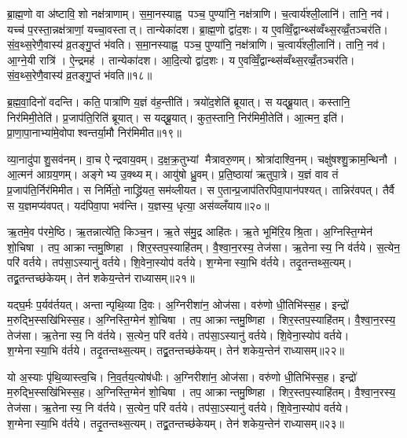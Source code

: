 ब्रा॒ह्म॒णो वा अ॑ष्टावि॒शो नक्ष॑त्राणाम्। स॒मा॒नस्याह्न॒ पञ्च॒ पुण्या॑नि॒ नक्ष॑त्राणि। च॒त्वार्य॑श्ली॒लानि॑। तानि॒ नव॑। यच्च॑ प॒रस्ता॒न्नक्ष॑त्राणां॒ यच्चा॒वस्तात्। तान्येका॑दश। ब्रा॒ह्म॒णो द्वा॑द॒शः। य ए॒वव्विँ॒द्वान्थ्स॑व्वँथ्स॒रव्व्रँ॒तञ्चर॑ति। सं॒व॒थ्स॒रेणै॒वास्य॑ व्र॒तङ्गु॒प्तं भ॑वति। स॒मा॒नस्याह्न॒ पञ्च॒ पुण्या॑नि॒ नक्ष॑त्राणि। च॒त्वार्य॑श्ली॒लानि॑। तानि॒ नव॑। आ॒ग्ने॒यी रात्रि॑। ऐ॒न्द्रमह॑। तान्येका॑दश। आ॒दि॒त्यो द्वा॑द॒शः। य ए॒वव्विँ॒द्वान्थ्स॑व्वँथ्स॒रव्व्रँ॒तञ्चर॑ति। सं॒व॒थ्स॒रेणै॒वास्य॑ व्र॒तङ्गु॒प्तं भ॑वति॥१८॥\anuvakamend[स॒ङ्ग॒वाथ्षो॑ड॒शिन॒न्निर॑मिमत॒ तत्तदात्त॑वीर्यन्निर्मा॒र्गो व॑देद्भवति समा॒नस्याह्न॒ पञ्च॒ पुण्या॑नि॒ नक्ष॑त्राण्य॒ष्टौ च॑]

ब्र॒ह्म॒वा॒दिनो॑ वदन्ति। कति॒ पात्रा॑णि य॒ज्ञं व॑ह॒न्तीति॑। त्रयो॑द॒शेति॑ ब्रूयात्। स यद्ब्रू॒यात्। कस्तानि॒ निर॑मिमी॒तेति॑। प्र॒जाप॑ति॒रिति॑ ब्रूयात्। स यद्ब्रू॒यात्। कुत॒स्तानि॒ निर॑मिमी॒तेति॑। आ॒त्मन॒ इति॑। प्रा॒णा॒पा॒नाभ्या॑मे॒वोपाश्वन्तर्या॒मौ निर॑मिमीत॥१९॥

व्या॒नादु॑पाशु॒सव॑नम्। वा॒च ऐन्द्रवाय॒वम्। द॒क्ष॒क्र॒तुभ्यां मैत्रावरु॒णम्। श्रोत्रा॑दाश्वि॒नम्। चक्षु॑षश्शु॒क्राम॒न्थिनौ। आ॒त्मन॑ आग्रय॒णम्। अङ्गेभ्य उ॒क्थ्यम्। आयु॑षो ध्रु॒वम्। प्र॒ति॒ष्ठाया॑ ऋतुपा॒त्रे। य॒ज्ञं वाव तं प्र॒जाप॑ति॒र्निर॑मिमीत। स निर्मि॑तो॒ नाद्ध्रि॑यत॒ सम॑व्लीयत। स ए॒तान्प्र॒जाप॑तिरपिवा॒पान॑पश्यत्। तान्निर॑वपत्। तैर्वै स य॒ज्ञमप्य॑वपत्। यद॑पिवा॒पा भव॑न्ति। य॒ज्ञस्य॒ धृत्या॒ अस॑व्व्लँयाय॥२०॥\anuvakamend[उ॒पा॒श्व॒न्त॒र्या॒मौ निर॑मिमीतामिमीत॒ षट्च॑]

ऋ॒तमे॒व प॑रमे॒ष्ठि। ऋ॒तन्नात्ये॑ति॒ किञ्च॒न। ऋ॒ते स॑मु॒द्र आहि॑तः। ऋ॒ते भूमि॑रि॒यश्रि॒ता। अ॒ग्निस्ति॒ग्मेन॑ शो॒चिषा। तप॒ आक्रान्तमु॒ष्णिहा। शिर॒स्तप॒स्याहि॑तम्। वै॒श्वा॒न॒रस्य॒ तेज॑सा। ऋ॒तेनास्य॒ नि व॑र्तये। स॒त्येन॒ परि॑ वर्तये। तप॑सा॒ऽस्यानु॑ वर्तये। शि॒वेना॒स्योप॑ वर्तये। श॒ग्मेनास्या॒भि व॑र्तये। तदृ॒तन्तथ्स॒त्यम्। तद्व्र॒तन्तच्छ॑केयम्। तेन॑ शकेय॒न्तेन॑ राध्यासम्॥२१॥

यद्घ॒र्मः प॒र्यव॑र्तयत्। अन्तान्पृथि॒व्या दि॒वः। अ॒ग्निरीशा॑न॒ ओज॑सा। वरु॑णो धी॒तिभि॑स्स॒ह। इन्द्रो॑ म॒रुद्भि॒स्सखि॑भिस्स॒ह। अ॒ग्निस्ति॒ग्मेन॑ शो॒चिषा। तप॒ आक्रान्तमु॒ष्णिहा। शिर॒स्तप॒स्याहि॑तम्। वै॒श्वा॒न॒रस्य॒ तेज॑सा। ऋ॒तेनास्य॒ नि व॑र्तये। स॒त्येन॒ परि॑ वर्तये। तप॑सा॒ऽस्यानु॑ वर्तये। शि॒वेना॒स्योप॑ वर्तये। श॒ग्मेनास्या॒भि व॑र्तये। तदृ॒तन्तथ्स॒त्यम्। तद्व्र॒तन्तच्छ॑केयम्। तेन॑ शकेय॒न्तेन॑ राध्यासम्॥२२॥

यो अ॒स्याः पृ॑थि॒व्यास्त्व॒चि। नि॒व॒र्तय॒त्योष॑धीः। अ॒ग्निरीशा॑न॒ ओज॑सा। वरु॑णो धी॒तिभि॑स्स॒ह। इन्द्रो॑ म॒रुद्भि॒स्सखि॑भिस्स॒ह। अ॒ग्निस्ति॒ग्मेन॑ शो॒चिषा। तप॒ आक्रान्तमु॒ष्णिहा। शिर॒स्तप॒स्याहि॑तम्। वै॒श्वा॒न॒रस्य॒ तेज॑सा। ऋ॒तेनास्य॒ नि व॑र्तये। स॒त्येन॒ परि॑ वर्तये। तप॑सा॒ऽस्यानु॑ वर्तये। शि॒वेना॒स्योप॑ वर्तये। श॒ग्मेनास्या॒भि व॑र्तये। तदृ॒तन्तथ्स॒त्यम्। तद्व्र॒तन्तच्छ॑केयम्। तेन॑ शकेय॒न्तेन॑ राध्यासम्॥२३॥


